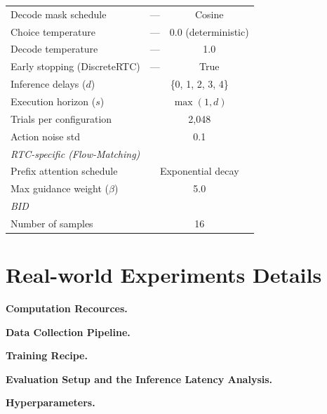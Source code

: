 \documentclass{article}
\begin{document}
\begin{table}[h]
\begin{tabular}{lcc}
Decode mask schedule & --- & Cosine \\
Choice temperature & --- & 0.0 (deterministic) \\
Decode temperature & --- & 1.0 \\
Early stopping (DiscreteRTC) & --- & True \\
Inference delays ($d$) & \multicolumn{2}{c}{\{0, 1, 2, 3, 4\}} \\
Execution horizon ($s$) & \multicolumn{2}{c}{$\max(1, d)$} \\
Trials per configuration & \multicolumn{2}{c}{2{,}048} \\
Action noise std & \multicolumn{2}{c}{0.1} \\
\midrule
\multicolumn{3}{l}{\textit{RTC-specific (Flow-Matching)}} \\
Prefix attention schedule & \multicolumn{2}{c}{Exponential decay} \\
Max guidance weight ($\beta$) & \multicolumn{2}{c}{5.0} \\
\midrule
\multicolumn{3}{l}{\textit{BID}} \\
Number of samples & \multicolumn{2}{c}{16} \\
\bottomrule
\end{tabular}
\end{table}




\section{Real-world Experiments Details}
\textbf{Computation Recources.}

\textbf{Data Collection Pipeline.}

\textbf{Training Recipe.}

\textbf{Evaluation Setup and the Inference Latency Analysis.}

\textbf{Hyperparameters.}
\end{document}
